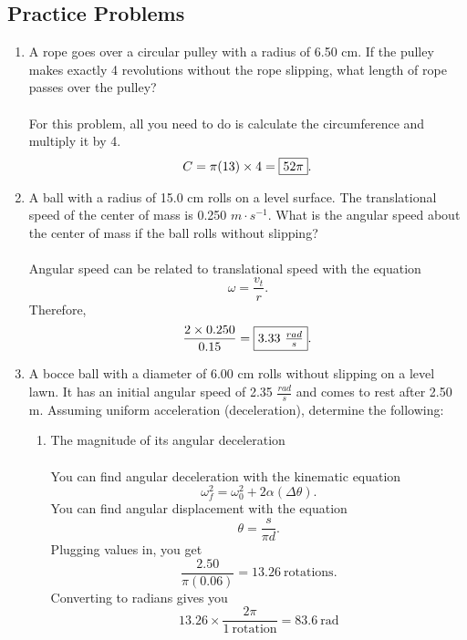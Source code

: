 \documentclass[a4paper]{report}
\begin{document}
    \subsection{Practice Problems}
    \begin{enumerate}
        \item A rope goes over a circular pulley with a radius of 6.50 cm. If the pulley makes exactly 4 revolutions without the rope slipping, what length of rope passes over the pulley? \\ \\
            For this problem, all you need to do is calculate the circumference and multiply it by 4.
            \[
                C = \pi(13) \times 4 = \fbox{$52\pi$}
            .\] 
        \item A ball with a radius of 15.0 cm rolls on a level surface. The translational speed of the center of mass is 0.250 $m \cdot s^{-1}$.  What is the angular speed about the center of mass if the ball rolls without slipping? \\ \\ 
            Angular speed can be related to translational speed with the equation
            \[
            \omega = \frac{v_t}{r}
            .\] 
            Therefore, 
            \[
                \frac{2 \times 0.250}{0.15} = \fbox{$3.33\ \frac{rad}{s}$}
            .\] 
        \item A bocce ball with a diameter of 6.00 cm rolls without slipping on a level lawn. It has an initial angular speed of 2.35 $\frac{rad}{s}$ and comes to rest after 2.50 m. Assuming uniform acceleration (deceleration), determine the following:
            \begin{enumerate}
                \item The magnitude of its angular deceleration \\ \\
                    You can find angular deceleration with the kinematic equation
                    \[
                        \omega_f^2 = \omega_0^2 + 2\alpha(\Delta \theta)
                    .\] 
                    You can find angular displacement with the equation
                    \[
                    \theta = \frac{s}{\pi d}
                    .\] 
                    Plugging values in, you get
                    \[
                        \frac{2.50}{\pi(0.06)} = 13.26\ \text{rotations}
                    .\] 
                    Converting to radians gives you
                    \[
                        13.26 \times \frac{2\pi}{1\ \text{rotation}} = 83.6\ \text{rad}
\]
\end{enumerate}
\end{enumerate}
\end{document}
